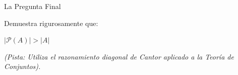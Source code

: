 \documentclass[10pt, aspectratio=169]{beamer}
\begin{document}
\begin{frame}{La Pregunta Final}
    \begin{center}
        \Large
        Demuestra rigurosamente que:
        
        \vspace{0.5cm}
        $|\mathcal{P}(A)| > |A|$
        
        \vspace{1.5cm}
        \normalsize \textit{(Pista: Utiliza el razonamiento diagonal de Cantor aplicado a la Teoría de Conjuntos).}
    \end{center}
\end{frame}
\end{document}
